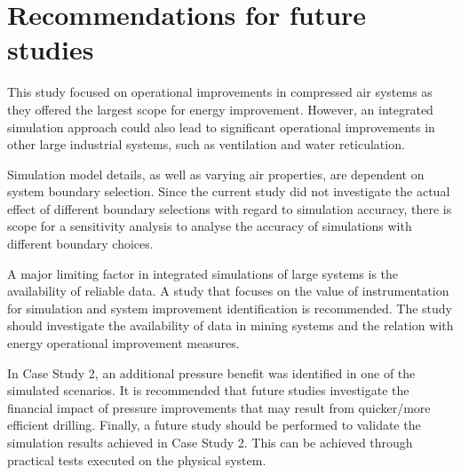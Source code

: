 	 \section{Recommendations for future studies}
	 This study focused on operational improvements in compressed air systems as they offered the largest scope for energy improvement. However, an integrated simulation approach could also lead to significant operational improvements in other large industrial systems, such as ventilation and water reticulation.
	 \par
	 \clearpage
	 Simulation model details, as well as varying air properties, are dependent on system boundary selection. Since the current study did not investigate the actual effect of different boundary selections with regard to simulation accuracy, there is scope for a sensitivity analysis to analyse the accuracy of simulations with different boundary choices.
	 \par
	 A major limiting factor in integrated simulations of large systems is the availability of reliable data. A study that focuses on the value of instrumentation for simulation and system improvement identification is recommended. The study should investigate the availability of data in mining systems and the  relation with energy operational improvement measures.
	 \par 
	 In Case Study 2, an additional pressure benefit was identified in one of the simulated scenarios. It is recommended that future studies investigate the financial impact of pressure improvements that may result from quicker/more efficient drilling. Finally, a future study should be performed to validate the simulation results achieved in Case Study 2. This can be achieved through practical tests executed on the physical system.
